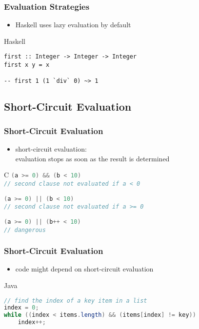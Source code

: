 \documentclass[dvipsnames]{beamer}
\theoremstyle{plain}
\begin{document}
\begin{frame}[fragile]
  \frametitle{Evaluation Strategies}

  \begin{itemize}
    \item Haskell uses lazy evaluation by default
  \end{itemize}

  \begin{exampleblock}{Haskell}
    \begin{lstlisting}
first :: Integer -> Integer -> Integer
first x y = x

-- first 1 (1 `div` 0) ~> 1
    \end{lstlisting}
  \end{exampleblock}
\end{frame}

\subsection{Short-Circuit Evaluation}

\begin{frame}
  \frametitle{Short-Circuit Evaluation}

  \begin{itemize}
    \item \alert{short-circuit evaluation}:\\
      evaluation stops as soon as the result is determined
  \end{itemize}

  \pause
  \begin{exampleblock}{C}
    \lstinline[language=C]!(a >= 0) && (b < 10)!\\
    \lstinline[language=C]!// second clause not evaluated if a < 0!

    \bigskip
    \lstinline[language=C]!(a >= 0) || (b < 10)!\\
    \lstinline[language=C]|// second clause not evaluated if a >= 0|

    \pause
    \bigskip
    \lstinline[language=C]!(a >= 0) || (b++ < 10)!\\
    \lstinline[language=C]!// dangerous!
  \end{exampleblock}
\end{frame}

\begin{frame}[fragile]
  \frametitle{Short-Circuit Evaluation}

  \begin{itemize}
    \item code might depend on short-circuit evaluation
  \end{itemize}

  \begin{exampleblock}{Java}
    \begin{lstlisting}[language=Java]
// find the index of a key item in a list
index = 0;
while ((index < items.length) && (items[index] != key))
    index++;
    \end{lstlisting}
  \end{exampleblock}
\end{frame}
\end{document}
